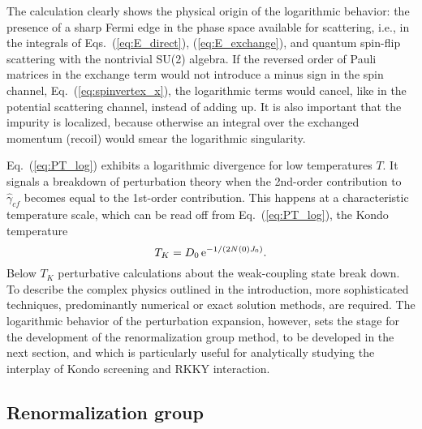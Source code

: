 \documentclass[12pt,twoside]{article}
\newcommand{\Eq}[1]{Eq.~(\ref{#1})}
\newcommand{\Eqs}[2]{Eqs.~(\ref{#1}), (\ref{#2})}
\begin{document}
The calculation clearly shows the physical origin of the logarithmic
behavior: the presence of a sharp Fermi edge in the phase space 
available for scattering, i.e., in the integrals of 
\Eqs{eq:E_direct}{eq:E_exchange}, and quantum spin-flip scattering
with the nontrivial SU(2) algebra. If the reversed order of 
Pauli matrices in the exchange term 
would not introduce a minus sign in the spin channel, \Eq{eq:spinvertex_x}, 
the logarithmic terms would cancel, like in the potential scattering channel, 
instead of adding up. 
It is also important that the impurity is localized, because otherwise 
an integral over the exchanged momentum (recoil) would smear the logarithmic 
singularity.

\Eq{eq:PT_log} exhibits a logarithmic divergence for low temperatures $T$.
It signals a breakdown of perturbation theory when the 2nd-order 
contribution to $\hat\gamma_{cf}$ becomes equal to the 1st-order contribution.
This happens at a characteristic temperature scale, which can be read
off from \Eq{eq:PT_log}, the Kondo temperature
\begin{equation}
T_K=D_0\,{\rm e}^{-1/(2N(0)J_0)}.
\label{eq:TK}
\end{equation}
Below $T_K$ perturbative calculations about the weak-coupling state 
break down. To describe the complex physics outlined in the introduction,
more sophisticated techniques, predominantly numerical or exact solution
methods, are required. The logarithmic behavior of the perturbation 
expansion, however, sets the stage for the development of the 
renormalization group method, to be developed in the next section, and
which is particularly useful for analytically studying the interplay of 
Kondo screening and RKKY interaction.

\subsection{Renormalization group}
\label{subsec:RG}
\end{document}
